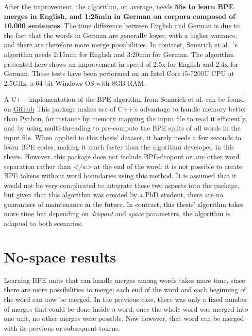 After the improvement, the algorithm, on average, needs \textbf{55s to learn BPE merges in English, and 1:25min in German on corpora composed of 10.000 sentences}. The time difference between English and German is due to the fact that the words in German are generally lower, with a higher variance, and there are therefore more merge possibilities. In contrast, Sennrich et al.~\cite{sennrich2015neural}'s algorithm needs 2:15min for English and 3:20min for German. The algorithm presented here shows an improvement in speed of 2.5x for English and 2.4x for German. These tests have been performed on an Intel Core i5-7200U CPU at 2.5GHz, a 64-bit Windows OS with 8GB RAM.

A C++ implementation of the BPE algorithm from Sennrich et al. can be found on \href{https://github.com/glample/fastBPE}{Github} This package makes use of C++'s advantage to handle memory better than Python, for instance by memory mapping the input file to read it efficiently, and by using multi-threading to pre-compute the BPE splits of all words in the input file. When applied to this thesis' dataset, it barely needs a few seconds to learn BPE codes, making it much faster than the algorithm developed in this thesis. However, this package does not include BPE-dropout or any other word separation rather than \emph{</w>} at the end of the word; it is not possible to create BPE tokens without word boundaries using this method. It is assumed that it would not be very complicated to integrate these two aspects into the package, but given that this algorithm was created by a PhD student, there are no guarantees of maintenance in the future. In contrast, this thesis' algorithm takes more time but depending on \emph{dropout} and \emph{space} parameters, the algorithm is adapted to both scenarios.

\section{No-space results}

Learning BPE units that can handle merges among words takes more time, since there are more possibilities to merge; each end of the word and each beginning of the word can now be merged. In the previous case, there was only a fixed number of merges that could be done inside a word, once the whole word was merged into one unit, no other merges were possible. Now however, that word can be merged with its previous or subsequent tokens.


